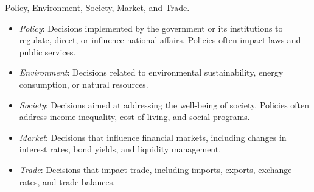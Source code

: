  Policy, Environment, Society, Market, and Trade.

\begin{itemize}
    \item \emph{Policy}: Decisions implemented by the government or its institutions to regulate, direct, or influence national affairs. Policies often impact laws and public services.
    \item \emph{Environment}: Decisions related to environmental sustainability, energy consumption, or natural resources.
    \item \emph{Society}: Decisions aimed at addressing the well-being of society. Policies often address income inequality, cost-of-living, and social programs.
    \item \emph{Market}: Decisions that influence financial markets, including changes in interest rates, bond yields, and liquidity management.
    \item \emph{Trade}: Decisions that impact trade, including imports, exports, exchange rates, and trade balances.
\end{itemize}

